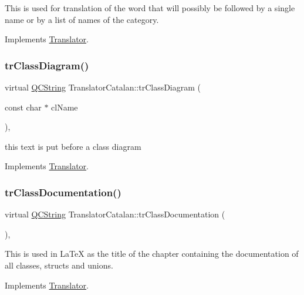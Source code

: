 This is used for translation of the word that will possibly be followed by a single name or by a list of names of the category. 

Implements \mbox{\hyperlink{class_translator}{Translator}}.

\mbox{\label{class_translator_catalan_ad44321972a3baa453f53b8a808f7ec7d}} 
\subsubsection{\texorpdfstring{trClassDiagram()}{trClassDiagram()}}
{\footnotesize\ttfamily virtual \mbox{\hyperlink{class_q_c_string}{Q\+C\+String}} Translator\+Catalan\+::tr\+Class\+Diagram (\begin{DoxyParamCaption}\item[{const char $\ast$}]{cl\+Name }\end{DoxyParamCaption})\hspace{0.3cm}{\ttfamily [inline]}, {\ttfamily [virtual]}}

this text is put before a class diagram 

Implements \mbox{\hyperlink{class_translator}{Translator}}.

\mbox{\label{class_translator_catalan_afd683fdf0d5cc3ed7c4984efa8509bb3}} 
\subsubsection{\texorpdfstring{trClassDocumentation()}{trClassDocumentation()}}
{\footnotesize\ttfamily virtual \mbox{\hyperlink{class_q_c_string}{Q\+C\+String}} Translator\+Catalan\+::tr\+Class\+Documentation (\begin{DoxyParamCaption}{ }\end{DoxyParamCaption})\hspace{0.3cm}{\ttfamily [inline]}, {\ttfamily [virtual]}}

This is used in La\+TeX as the title of the chapter containing the documentation of all classes, structs and unions. 

Implements \mbox{\hyperlink{class_translator}{Translator}}.

